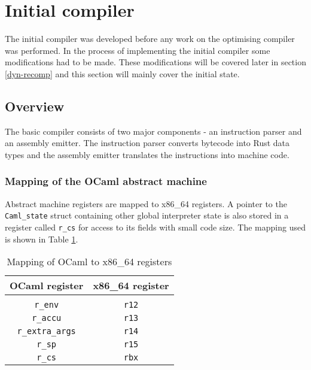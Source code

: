 \section{Initial compiler}

The initial compiler was developed before any work on the optimising compiler was performed. In the
process of implementing the initial compiler some modifications had to be made. These modifications
will be covered later in section \ref{dyn-recomp} and this section will mainly cover the initial
state.

\subsection{Overview}

The basic compiler consists of two major components - an instruction parser and an assembly
emitter. The instruction parser converts bytecode into Rust data types and the assembly emitter
translates the instructions into machine code.

\subsubsection{Mapping of the OCaml abstract machine}

Abstract machine registers are mapped to x86\_64 registers. A pointer to the \texttt{Caml\_state}
struct containing other global interpreter state is also stored in a register called \texttt{r\_cs}
for access to its fields with small code size. The mapping used is shown in Table
\ref{table:regmap}.

\begin{table}[h]
      \centering
      \begin{tabular}{cc}\toprule
            OCaml register          & x86\_64 register \\
            \midrule                                   \\
            \texttt{r\_env}         & \texttt{r12}     \\
            \texttt{r\_accu}        & \texttt{r13}     \\
            \texttt{r\_extra\_args} & \texttt{r14}     \\
            \texttt{r\_sp}          & \texttt{r15}     \\
            \texttt{r\_cs}          & \texttt{rbx}     \\
            \bottomrule
      \end{tabular}

      \caption{Mapping of OCaml to x86\_64 registers}
      \label{table:regmap}
\end{table}

